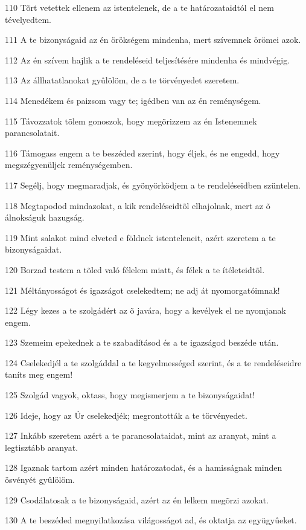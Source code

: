 \par 110 Tõrt vetettek ellenem az istentelenek, de a te határozataidtól el nem tévelyedtem.
\par 111 A te bizonyságaid az én örökségem mindenha, mert szívemnek örömei azok.
\par 112 Az én szívem hajlik a te rendeléseid teljesítésére mindenha és mindvégig.
\par 113 Az állhatatlanokat gyûlölöm, de a te törvényedet szeretem.
\par 114 Menedékem és paizsom vagy te; igédben van az én reménységem.
\par 115 Távozzatok tõlem gonoszok, hogy megõrizzem az én Istenemnek parancsolatait.
\par 116 Támogass engem a te beszéded szerint, hogy éljek, és ne engedd, hogy megszégyenüljek reménységemben.
\par 117 Segélj, hogy megmaradjak, és gyönyörködjem a te rendeléseidben szüntelen.
\par 118 Megtapodod mindazokat, a kik rendeléseidtõl elhajolnak, mert az õ álnokságuk hazugság.
\par 119 Mint salakot mind elveted e földnek istenteleneit, azért szeretem a te bizonyságaidat.
\par 120 Borzad testem a tõled való félelem miatt, és félek a te ítéleteidtõl.
\par 121 Méltányosságot és igazságot cselekedtem; ne adj át nyomorgatóimnak!
\par 122 Légy kezes a te szolgádért az õ javára, hogy a kevélyek el ne nyomjanak engem.
\par 123 Szemeim epekednek a te szabadításod és a te igazságod beszéde után.
\par 124 Cselekedjél a te szolgáddal a te kegyelmességed szerint, és a te rendeléseidre taníts meg engem!
\par 125 Szolgád vagyok, oktass, hogy megismerjem a te bizonyságaidat!
\par 126 Ideje, hogy az Úr cselekedjék; megrontották a te törvényedet.
\par 127 Inkább szeretem azért a te parancsolataidat, mint az aranyat, mint a legtisztább aranyat.
\par 128 Igaznak tartom azért minden határozatodat, és a hamisságnak minden ösvényét gyûlölöm.
\par 129 Csodálatosak a te bizonyságaid, azért az én lelkem megõrzi azokat.
\par 130 A te beszéded megnyilatkozása világosságot ad, és oktatja az együgyûeket.
